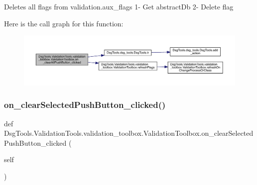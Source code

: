 \begin{DoxyVerb}Deletes all flags from validation.aux_flags
1- Get abstractDb
2- Delete flag
\end{DoxyVerb}
 Here is the call graph for this function\+:
\nopagebreak
\begin{figure}[H]
\begin{center}
\leavevmode
\includegraphics[width=350pt]{class_dsg_tools_1_1_validation_tools_1_1validation__toolbox_1_1_validation_toolbox_a432d54a99a98cbfe5a947839bdbf7b59_cgraph}
\end{center}
\end{figure}
\mbox{\label{class_dsg_tools_1_1_validation_tools_1_1validation__toolbox_1_1_validation_toolbox_aea049950dc68fe76461c057baac3401f}} 
\subsubsection{\texorpdfstring{on\+\_\+clear\+Selected\+Push\+Button\+\_\+clicked()}{on\_clearSelectedPushButton\_clicked()}}
{\footnotesize\ttfamily def Dsg\+Tools.\+Validation\+Tools.\+validation\+\_\+toolbox.\+Validation\+Toolbox.\+on\+\_\+clear\+Selected\+Push\+Button\+\_\+clicked (\begin{DoxyParamCaption}\item[{}]{self }\end{DoxyParamCaption})}

